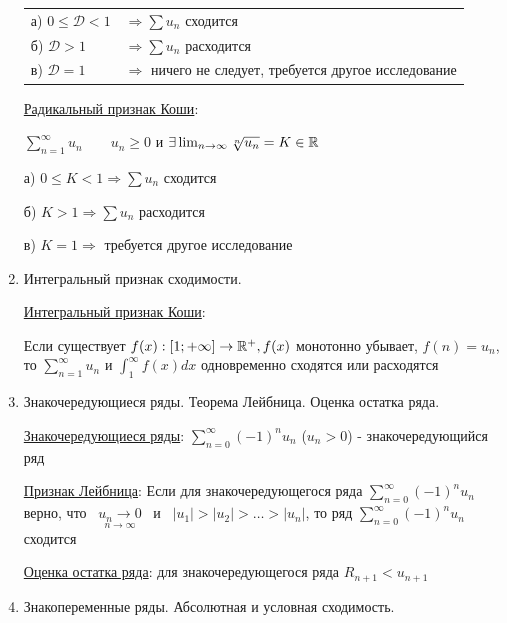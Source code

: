 \documentclass[12pt]{article}
\begin{document}
\begin{enumerate}
    \begin{tabular}{ll}
        а) $0 \leq \mathcal{D} < 1$ & $\Longrightarrow \sum u_n$ сходится                                \\

        б) $\mathcal{D} > 1$        & $\Longrightarrow \sum u_n$ расходится                              \\

        в) $\mathcal{D} = 1$        & $\Longrightarrow$ ничего не следует, требуется другое исследование \\
    \end{tabular}

    \hyperlink{cauchyradicalsign}{Радикальный признак Коши}:

    $\sum_{n = 1}^\infty u_n \quad\quad u_n \geq 0$ и $\exists \lim_{n \to \infty} \sqrt[n]{u_n} = K \in \mathbb{R}$

    а) $0 \leq K < 1 \Longrightarrow \sum u_n$ сходится

    б) $K > 1 \Longrightarrow \sum u_n$ расходится

    в) $K = 1 \Longrightarrow$ требуется другое исследование

    \item Интегральный признак сходимости.

    \hyperlink{cauchyintegralsign}{Интегральный признак Коши}:

    Если существует $f(x) : [1; +\infty] \to \mathbb{R}^+, f(x)$ монотонно убывает, $f(n) = u_n$, то $\sum_{n = 1}^\infty u_n$ и $\int_{1}^\infty f(x) dx$ одновременно сходятся или расходятся

    \item Знакочередующиеся ряды. Теорема Лейбница. Оценка остатка ряда.

    \hyperlink{alternatingsignseries}{Знакочередующиеся ряды}: $\sum_{n = 0}^\infty (-1)^n u_n$ ($u_n > 0$) - знакочередующийся ряд

    \hyperlink{leibniztheorem}{Признак Лейбница}: Если для знакочередующегося ряда $\sum_{n = 0}^\infty (-1)^n u_n$ верно,
    что \ $\underset{n \to \infty}{u_n \to 0}$ \ и \ $|u_1| > |u_2| > \dots > |u_n|$,
    то ряд $\sum_{n = 0}^\infty (-1)^n u_n$ сходится

    \hyperlink{seriesremainderevaluation}{Оценка остатка ряда}: для знакочередующегося ряда $R_{n + 1} < u_{n + 1}$

    \item Знакопеременные ряды. Абсолютная и условная сходимость.


\end{enumerate}
\end{document}
